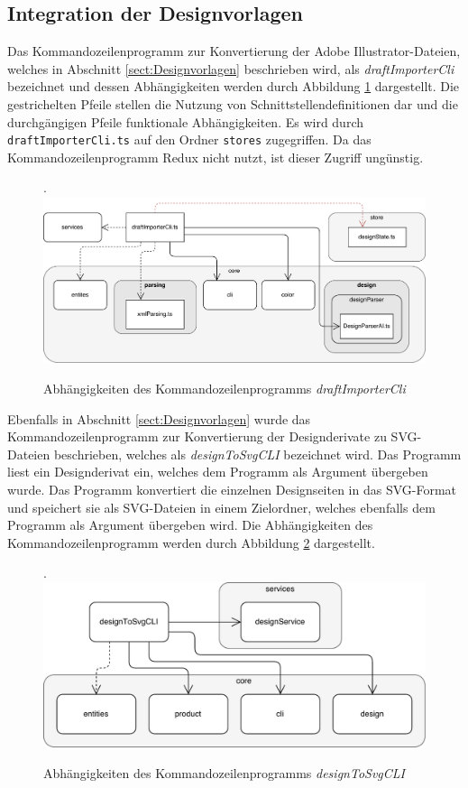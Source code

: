 \subsection{Integration der Designvorlagen}
\label{Kommandozeilenprogramme}
Das Kommandozeilenprogramm zur Konvertierung der Adobe Illustrator-Dateien, welches in Abschnitt \ref{sect:Designvorlagen} beschrieben wird, als \emph{draftImporterCli} bezeichnet und dessen Abhängigkeiten werden durch Abbildung \ref{fig:DesignImport} dargestellt.
Die gestrichelten Pfeile stellen die Nutzung von Schnittstellendefinitionen dar und die durchgängigen Pfeile funktionale Abhängigkeiten. Es wird durch \lstinline|draftImporterCli.ts| auf den Ordner \lstinline|stores| zugegriffen. Da das Kommandozeilenprogramm Redux nicht nutzt, ist dieser Zugriff ungünstig.


\begin{figure}[H]
    \centering
    \caption{Abhängigkeiten des Kommandozeilenprogramms \emph{draftImporterCli}}.
    \includegraphics[width=.9\textwidth]{diagrams/Ist-Architektur/draftImporter-analysis.pdf}
    \label{fig:DesignImport}
\end{figure}
Ebenfalls in Abschnitt \ref{sect:Designvorlagen} wurde das Kommandozeilenprogramm zur Konvertierung der Designderivate zu SVG-Dateien beschrieben, welches als  \emph{designToSvgCLI} bezeichnet wird.
Das Programm liest ein Designderivat ein, welches dem Programm als Argument übergeben wurde. Das Programm konvertiert die einzelnen Designseiten in das SVG-Format und speichert sie als SVG-Dateien in einem Zielordner, welches ebenfalls dem Programm als Argument übergeben wird. 
Die Abhängigkeiten des Kommandozeilenprogramm werden durch Abbildung \ref{fig:DesignToSvg} dargestellt.

\begin{figure}[H]
    \centering
    \caption{Abhängigkeiten des Kommandozeilenprogramms \emph{designToSvgCLI}}.
    \includegraphics[width=.9\textwidth]{diagrams/Ist-Architektur/designToSvgCLI-analysis.pdf}
    \label{fig:DesignToSvg}
\end{figure}

